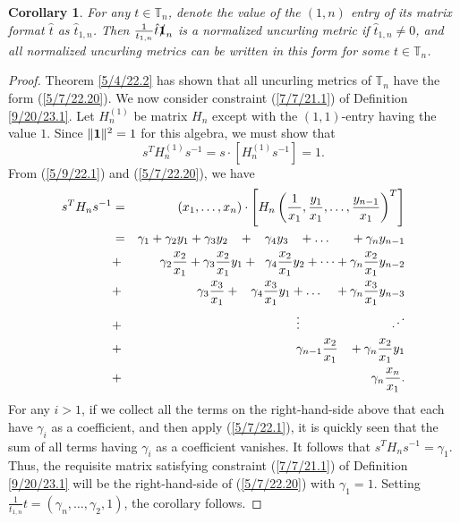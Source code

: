 \documentclass{amsart}
\numberwithin{equation}{section}
\newtheorem{corollary}[theorem]{Corollary}
\theoremstyle{definition}
\numberwithin{theorem}{section}
\begin{document}
\begin{corollary}\label{7/1/22.1} For any $t\in \mathbb{T}_n$, denote the value of the $(1,n)$ entry of its matrix format $\hat{t}$ as $\hat{t}_{1,n}$.  Then $\frac{1}{t_{1,n}}\hat{t}\slashed{\bf 1}_n$ is a normalized uncurling metric if $\hat{t}_{1,n}\ne 0$, and all normalized uncurling metrics can be written in this form for some $t\in \mathbb{T}_n$. \end{corollary}
\begin{proof} Theorem \ref{5/4/22.2} has shown that all uncurling metrics of $\mathbb{T}_n$ have the form (\ref{5/7/22.20}).
We now consider constraint (\ref{7/7/21.1}) of Definition \ref{9/20/23.1}.  Let $H_n^{(1)}$ be matrix $H_n$ except with the  $(1,1)$-entry having the value $1$.
Since $\|{\bf 1}\|^2 =1$ for this algebra, we must show that \[ s^T H_n^{(1)} s^{-1} = s\cdot [H_n^{(1)}s^{-1}] = 1.\] \enlargethispage{3cm} From (\ref{5/9/22.1}) and (\ref{5/7/22.20}), we have
\begin{eqnarray}\nonumber s^T H_n s^{-1} &=& (x_1,\dots,x_n)\cdot \left[ H_n \left(\frac{1}{x_1}, \frac{y_1}{x_1},\dots,\frac{y_{n-1}}{x_1}\right)^T\right] \\ 
 &=&  \gamma_1 + \gamma_2y_1 + \gamma_3y_2 \hspace{3mm} + \hspace{3mm}\gamma_4y_3 \hspace{3mm} + \dots   \hspace{6mm}+\gamma_ny_{n-1} \nonumber \\
&+&  \gamma_2 \frac{x_2}{x_1} + \gamma_3\frac{x_2}{x_1}y_1 + \hspace{2mm} \gamma_4\frac{x_2}{x_1}y_2 + \dots +  \gamma_n\frac{x_2}{x_1}y_{n-2} \nonumber \\ &+&\gamma_3 \frac{x_3}{x_1}  + \hspace{3mm}\gamma_4\frac{x_3}{x_1}y_1 +  \dots \hspace{4mm} +  \gamma_n\frac{x_3}{x_1}y_{n-3} \nonumber \\ 
&+&  \hspace{5mm} \vdots \hspace{2.5cm} \iddots \bigskip\bigskip \nonumber \\ &+& \gamma_{n-1} \frac{x_2}{x_1} \hspace{3mm} + \gamma_n \frac{x_2}{x_1}y_1 \nonumber \\ &+& \hspace{2mm} \gamma_n\frac{x_n}{x_1}. \label{6/23/22.1}
 \end{eqnarray}
 For any $i>1$, if we collect all the terms on the right-hand-side above that each have $\gamma_i$ as a coefficient, and then apply (\ref{5/7/22.1}), it is quickly seen that the sum of all terms having $\gamma_i$ as a coefficient vanishes.  It follows that
 $s^T H_n s^{-1} =\gamma_1$.   Thus, the requisite matrix satisfying constraint (\ref{7/7/21.1}) of Definition \ref{9/20/23.1} will be the right-hand-side of (\ref{5/7/22.20}) with $\gamma_1=1$.  Setting $\frac{1}{t_{1,n}}t = (\gamma_n,\dots,\gamma_2, 1)$, the corollary follows.
\end{proof}
\end{document}

